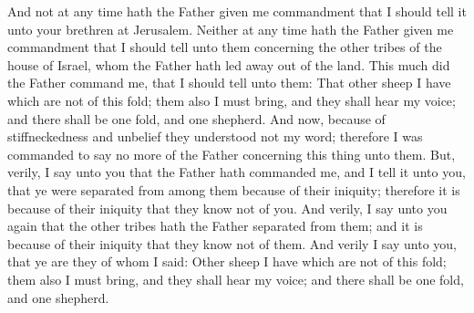 And not at any time hath the Father given me commandment that I should tell it unto your brethren at Jerusalem.
\bverse \iffalse Neither at any time hath the Father given me commandment that I should tell unto them concerning the other tribes of the house of Israel, whom the Father hath led away out of the land. \fi
Neither at any time hath the Father given me commandment that I should tell unto them concerning the other tribes of the house of Israel, whom the Father hath led away out of the land.
\bverse \iffalse This much did the Father command me, that I should tell unto them: \fi
This much did the Father command me, that I should tell unto them:
\bverse \iffalse That other sheep I have which are not of this fold; them also I must bring, and they shall hear my voice; and there shall be one fold, and one shepherd. \fi
That other sheep I have which are not of this fold; them also I must bring, and they shall hear my voice; and there shall be one fold, and one shepherd.
\bverse \iffalse And now, because of stiffneckedness and unbelief they understood not my word; therefore I was commanded to say no more of the Father concerning this thing unto them. \fi
And now, because of stiffneckedness and unbelief they understood not my word; therefore I was commanded to say no more of the Father concerning this thing unto them.
\bverse \iffalse But, verily, I say unto you that the Father hath commanded me, and I tell it unto you, that ye were separated from among them because of their iniquity; therefore it is because of their iniquity that they know not of you. \fi
But, verily, I say unto you that the Father hath commanded me, and I tell it unto you, that ye were separated from among them because of their iniquity; therefore it is because of their iniquity that they know not of you.
\bverse \iffalse And verily, I say unto you again that the other tribes hath the Father separated from them; and it is because of their iniquity that they know not of them. \fi
And verily, I say unto you again that the other tribes hath the Father separated from them; and it is because of their iniquity that they know not of them.
\bverse \iffalse And verily I say unto you, that ye are they of whom I said: Other sheep I have which are not of this fold; them also I must bring, and they shall hear my voice; and there shall be one fold, and one shepherd. \fi
And verily I say unto you, that ye are they of whom I said: Other sheep I have which are not of this fold; them also I must bring, and they shall hear my voice; and there shall be one fold, and one shepherd.

